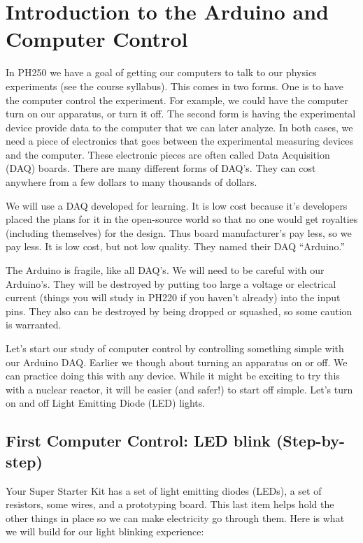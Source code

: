 \chapter{Introduction to the Arduino and Computer Control}
In PH250 we have a goal of getting our computers to talk to our physics
experiments (see the course syllabus). This comes in two forms. One is to
have the computer control the experiment. For example, we could have the
computer turn on our apparatus, or turn it off. The second form is having
the experimental device provide data to the computer that we can later
analyze. In both cases, we need a piece of electronics that goes between the
experimental measuring devices and the computer. These electronic pieces are
often called Data Acquisition (DAQ) boards. There are many different forms
of DAQ's. They can cost anywhere from a few dollars to many thousands of
dollars.

We will use a DAQ developed for learning. It is low cost because it's
developers placed the plans for it in the open-source world so that no one
would get royalties (including themselves) for the design. Thus board
manufacturer's pay less, so we pay less. It is low cost, but not low
quality. They named their DAQ \textquotedblleft Arduino.\textquotedblright\ 

The Arduino is fragile, like all DAQ's. We will need to be careful with our
Arduino's. They will be destroyed by putting too large a voltage or electrical current (things you will study in PH220 if you haven't already) into the input pins. They also can be destroyed by being dropped or squashed, so some caution is warranted.

Let's start our study of computer control by controlling something simple
with our Arduino DAQ. Earlier we though about turning an apparatus on or
off. We can practice doing this with any device. While it might be exciting
to try this with a nuclear reactor, it will be easier (and safer!) to start
off simple. Let's turn on and off Light Emitting Diode (LED) lights.

\section{First Computer Control: LED blink (Step-by-step)}

Your Super Starter Kit has a set of light emitting diodes (LEDs), a set of
resistors, some wires, and a prototyping board. This last item helps hold the
other things in place so we can make electricity go through them. Here is
what we will build for our light blinking experience:

